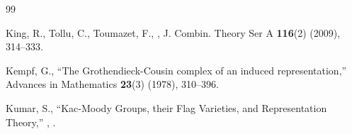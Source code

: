 \documentclass[12pt,reqno]{amsart}
\theoremstyle{definition}
\begin{document}
\begin{thebibliography}{99}
	
	

	
	
	
	
	
	King, R., Tollu, C., Toumazet, F., 
	,
	\newblock J. Combin. Theory Ser A {\bf 116}(2) (2009), 314--333. 
	
	

	Kempf, G., 
	\newblock ``The Grothendieck-Cousin complex of an induced representation,''
	\newblock Advances in Mathematics {\bf 23}(3) (1978), 310--396.
	
	Kumar, S.,
	\newblock``Kac-Moody Groups, their Flag Varieties, and Representation Theory,''
	,
	.
	
%	
%	
%	
	

\end{thebibliography}
\end{document}
